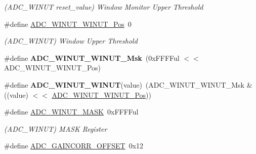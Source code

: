 \begin{DoxyCompactItemize}
\begin{DoxyCompactList}\small\item\em (A\+D\+C\+\_\+\+W\+I\+N\+U\+T reset\+\_\+value) Window Monitor Upper Threshold \end{DoxyCompactList}\item 
\hypertarget{group___s_a_m_l21___a_d_c_ga568d14d8329991a576f1cf45560320e8}{}\#define \hyperlink{group___s_a_m_l21___a_d_c_ga568d14d8329991a576f1cf45560320e8}{A\+D\+C\+\_\+\+W\+I\+N\+U\+T\+\_\+\+W\+I\+N\+U\+T\+\_\+\+Pos}~0\label{group___s_a_m_l21___a_d_c_ga568d14d8329991a576f1cf45560320e8}

\begin{DoxyCompactList}\small\item\em (A\+D\+C\+\_\+\+W\+I\+N\+U\+T) Window Upper Threshold \end{DoxyCompactList}\item 
\hypertarget{group___s_a_m_l21___a_d_c_ga9475b0d3b2f4635ef6f91197a23fbd0a}{}\#define {\bfseries A\+D\+C\+\_\+\+W\+I\+N\+U\+T\+\_\+\+W\+I\+N\+U\+T\+\_\+\+Msk}~(0x\+F\+F\+F\+Ful $<$$<$ A\+D\+C\+\_\+\+W\+I\+N\+U\+T\+\_\+\+W\+I\+N\+U\+T\+\_\+\+Pos)\label{group___s_a_m_l21___a_d_c_ga9475b0d3b2f4635ef6f91197a23fbd0a}

\item 
\hypertarget{group___s_a_m_l21___a_d_c_ga1a2e8bfd63894a71e7aba18cec13a07a}{}\#define {\bfseries A\+D\+C\+\_\+\+W\+I\+N\+U\+T\+\_\+\+W\+I\+N\+U\+T}(value)~(A\+D\+C\+\_\+\+W\+I\+N\+U\+T\+\_\+\+W\+I\+N\+U\+T\+\_\+\+Msk \& ((value) $<$$<$ \hyperlink{group___s_a_m_l21___a_d_c_ga568d14d8329991a576f1cf45560320e8}{A\+D\+C\+\_\+\+W\+I\+N\+U\+T\+\_\+\+W\+I\+N\+U\+T\+\_\+\+Pos}))\label{group___s_a_m_l21___a_d_c_ga1a2e8bfd63894a71e7aba18cec13a07a}

\item 
\hypertarget{group___s_a_m_l21___a_d_c_ga2e84ef9dbc511208c72848d87713a04b}{}\#define \hyperlink{group___s_a_m_l21___a_d_c_ga2e84ef9dbc511208c72848d87713a04b}{A\+D\+C\+\_\+\+W\+I\+N\+U\+T\+\_\+\+M\+A\+S\+K}~0x\+F\+F\+F\+Ful\label{group___s_a_m_l21___a_d_c_ga2e84ef9dbc511208c72848d87713a04b}

\begin{DoxyCompactList}\small\item\em (A\+D\+C\+\_\+\+W\+I\+N\+U\+T) M\+A\+S\+K Register \end{DoxyCompactList}\item 
\hypertarget{group___s_a_m_l21___a_d_c_ga3a08e951226da91279bab7223313a03f}{}\#define \hyperlink{group___s_a_m_l21___a_d_c_ga3a08e951226da91279bab7223313a03f}{A\+D\+C\+\_\+\+G\+A\+I\+N\+C\+O\+R\+R\+\_\+\+O\+F\+F\+S\+E\+T}~0x12\label{group___s_a_m_l21___a_d_c_ga3a08e951226da91279bab7223313a03f}


\end{DoxyCompactItemize}
